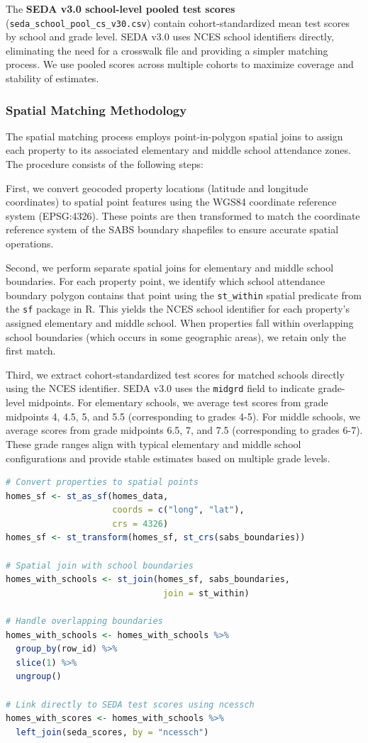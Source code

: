 \documentclass{article}
\begin{document}
The \textbf{SEDA v3.0 school-level pooled test scores} (\texttt{seda\_school\_pool\_cs\_v30.csv}) contain cohort-standardized mean test scores by school and grade level. SEDA v3.0 uses NCES school identifiers directly, eliminating the need for a crosswalk file and providing a simpler matching process. We use pooled scores across multiple cohorts to maximize coverage and stability of estimates.

\subsubsection{Spatial Matching Methodology}

The spatial matching process employs point-in-polygon spatial joins to assign each property to its associated elementary and middle school attendance zones. The procedure consists of the following steps:

First, we convert geocoded property locations (latitude and longitude coordinates) to spatial point features using the WGS84 coordinate reference system (EPSG:4326). These points are then transformed to match the coordinate reference system of the SABS boundary shapefiles to ensure accurate spatial operations.

Second, we perform separate spatial joins for elementary and middle school boundaries. For each property point, we identify which school attendance boundary polygon contains that point using the \texttt{st\_within} spatial predicate from the \texttt{sf} package in R. This yields the NCES school identifier for each property's assigned elementary and middle school. When properties fall within overlapping school boundaries (which occurs in some geographic areas), we retain only the first match.

Third, we extract cohort-standardized test scores for matched schools directly using the NCES identifier. SEDA v3.0 uses the \texttt{midgrd} field to indicate grade-level midpoints. For elementary schools, we average test scores from grade midpoints 4, 4.5, 5, and 5.5 (corresponding to grades 4-5). For middle schools, we average scores from grade midpoints 6.5, 7, and 7.5 (corresponding to grades 6-7). These grade ranges align with typical elementary and middle school configurations and provide stable estimates based on multiple grade levels.

\begin{lstlisting}[language=R]
# Convert properties to spatial points
homes_sf <- st_as_sf(homes_data,
                     coords = c("long", "lat"),
                     crs = 4326)
homes_sf <- st_transform(homes_sf, st_crs(sabs_boundaries))

# Spatial join with school boundaries
homes_with_schools <- st_join(homes_sf, sabs_boundaries,
                               join = st_within)

# Handle overlapping boundaries
homes_with_schools <- homes_with_schools %>%
  group_by(row_id) %>%
  slice(1) %>%
  ungroup()

# Link directly to SEDA test scores using ncessch
homes_with_scores <- homes_with_schools %>%
  left_join(seda_scores, by = "ncessch")
\end{lstlisting}
\end{document}
